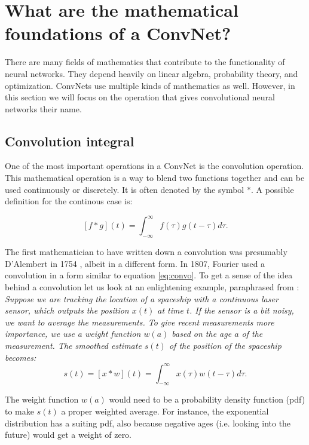 \section{What are the mathematical foundations of a ConvNet?}
\label{sec:math}

There are many fields of mathematics that contribute to the functionality of neural networks. They depend heavily on linear algebra, probability theory, and optimization. ConvNets use multiple kinds of mathematics as well. However, in this section we will focus on the operation that gives convolutional neural networks their name.

\subsection{Convolution integral}

One of the most important operations in a ConvNet is the convolution operation. This mathematical operation is a way to blend two functions together \cite{wolf} and can be used continuously or discretely. It is often denoted by the symbol $*$. A possible definition for the continous case is:

\begin{equation}\label{eq:convo}
    [f * g] (t) = \int_{-\infty}^{\infty} f(\tau)g(t-\tau) d\tau.
\end{equation}

The first mathematician to have written down a convolution was presumably D'Alembert in 1754 \cite{tor}, albeit in a different form. In 1807, Fourier used a convolution in a form similar to equation \eqref{eq:convo}. To get a sense of the idea behind a convolution let us look at an enlightening example, paraphrased from \cite[Ch. 9]{dl-book}:\\

\textit{Suppose we are tracking the location of a spaceship with a continuous laser sensor, which outputs the position $x(t)$ at time $t$. If the sensor is a bit noisy, we want to average the measurements. To give recent measurements more importance, we use a weight function $w(a)$ based on the age $a$ of the measurement. The smoothed estimate $s(t)$ of the position of the spaceship becomes:
}
\begin{equation}
    s(t) = [x*w](t) = \int_{-\infty}^{\infty} x(\tau)w(t-\tau)d\tau.
\end{equation}

The weight function $w(a)$ would need to be a probability density function (pdf) to make $s(t)$ a proper weighted average. For instance, the exponential distribution has a suiting pdf, also because negative ages (i.e. looking into the future) would get a weight of zero.\\


